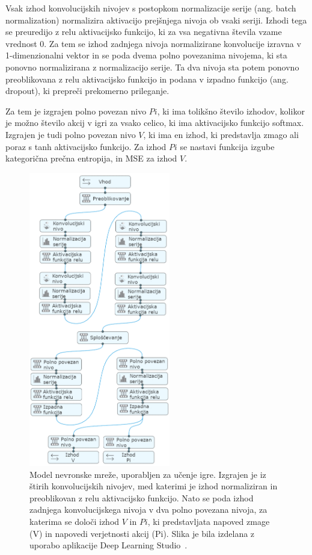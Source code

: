 \documentclass[a4paper, 12pt]{book}
\begin{document}
{Vsak izhod konvolucijskih nivojev s postopkom normalizacije serije (ang. batch normalization) normalizira aktivacijo prejšnjega nivoja ob vsaki seriji.
Izhodi tega se preuredijo z relu aktivacijsko funkcijo, ki za vsa negativna števila vzame vrednost 0.
Za tem se izhod zadnjega nivoja normalizirane konvolucije izravna v 1-dimenzionalni vektor in se poda dvema polno povezanima nivojema, ki sta ponovno normalizirana z normalizacijo serije.
Ta dva nivoja sta potem ponovno preoblikovana z relu aktivacijsko funkcijo in podana v izpadno funkcijo (ang. dropout), ki prepreči prekomerno prileganje.

Za tem je izgrajen polno povezan nivo $Pi$, ki ima tolikšno število izhodov, kolikor je možno število akcij v igri za vsako celico, ki ima aktivacijsko funkcijo softmax.
Izgrajen je tudi polno povezan nivo $V$, ki ima en izhod, ki predstavlja zmago ali poraz s tanh aktivacijsko funkcijo.
Za izhod $Pi$ se nastavi funkcija izgube kategorična prečna entropija, in MSE za izhod $V$.

\begin{figure}[h!]
	\begin{center}
		\includegraphics[width=0.55\textwidth]{photos/model_using_deepcognition.pdf}
	\end{center}
	\caption{Model nevronske mreže, uporabljen za učenje igre. Izgrajen je iz štirih konvolucijskih nivojev, med katerimi je izhod normaliziran in preoblikovan z relu aktivacijsko funkcijo. 
		Nato se poda izhod zadnjega konvolucijskega nivoja v dva polno povezana nivoja, za katerima se določi izhod $V$ in $Pi$, ki predstavljata napoved zmage (V) in napovedi verjetnosti akcij (Pi).
		Slika je bila izdelana z uporabo aplikacije Deep Learning Studio~\cite{deepcognition}.}
	\label{vizualzacijaModela}
\end{figure}

}
\end{document}

